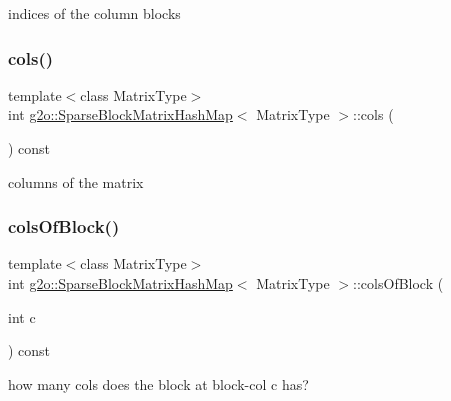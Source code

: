 indices of the column blocks 

\mbox{\label{classg2o_1_1_sparse_block_matrix_hash_map_a8bd11b2428897c5c086f0d903affcbec}} 
\subsubsection{\texorpdfstring{cols()}{cols()}}
{\footnotesize\ttfamily template$<$class Matrix\+Type$>$ \\
int \mbox{\hyperlink{classg2o_1_1_sparse_block_matrix_hash_map}{g2o\+::\+Sparse\+Block\+Matrix\+Hash\+Map}}$<$ Matrix\+Type $>$\+::cols (\begin{DoxyParamCaption}{ }\end{DoxyParamCaption}) const\hspace{0.3cm}{\ttfamily [inline]}}



columns of the matrix 

\mbox{\label{classg2o_1_1_sparse_block_matrix_hash_map_a7f9538beeea7bed6300e864dbefccff5}} 
\subsubsection{\texorpdfstring{cols\+Of\+Block()}{colsOfBlock()}}
{\footnotesize\ttfamily template$<$class Matrix\+Type$>$ \\
int \mbox{\hyperlink{classg2o_1_1_sparse_block_matrix_hash_map}{g2o\+::\+Sparse\+Block\+Matrix\+Hash\+Map}}$<$ Matrix\+Type $>$\+::cols\+Of\+Block (\begin{DoxyParamCaption}\item[{int}]{c }\end{DoxyParamCaption}) const\hspace{0.3cm}{\ttfamily [inline]}}



how many cols does the block at block-\/col c has? 

